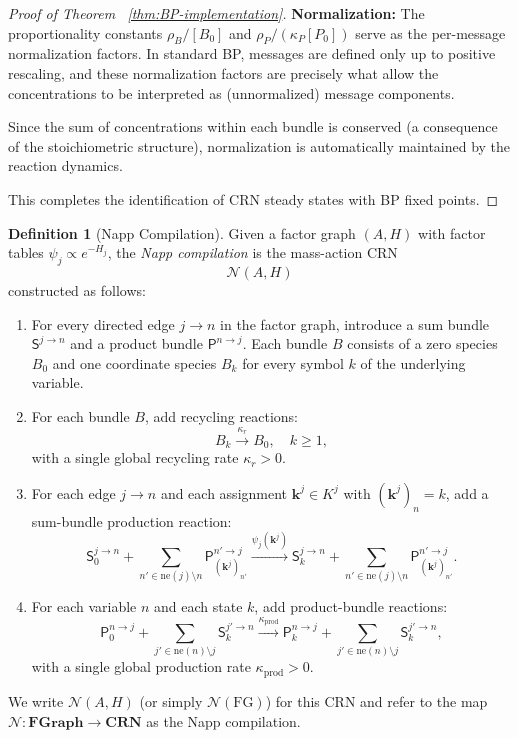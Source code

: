 \documentclass{article}
\theoremstyle{plain}
\theoremstyle{definition}
\newtheorem{definition}[theorem]{Definition}
\theoremstyle{remark}
\newcommand{\<}{\langle}
\renewcommand{\>}{\rangle}
\begin{document}
\begin{proof}[Proof of Theorem ~\ref{thm:BP-implementation}]
\textbf{Normalization:} The proportionality constants $\rho_B/[B_0]$ and 
$\rho_P/(\kappa_P [P_0])$ serve as the per-message normalization factors. 
In standard BP, messages are defined only up to positive rescaling, and these 
normalization factors are precisely what allow the concentrations to be interpreted 
as (unnormalized) message components.

Since the sum of concentrations within each bundle is conserved (a consequence of 
the stoichiometric structure), normalization is automatically maintained by the 
reaction dynamics.

This completes the identification of CRN steady states with BP fixed points.
\end{proof}

\begin{definition}[Napp Compilation]\label{def:napp-compilation}
Given a factor graph $(A, H)$ with factor tables $\psi_j \propto e^{-H_j}$, the 
\emph{Napp compilation} is the mass-action CRN
\[
\mathcal{N}(A, H)
\]
constructed as follows:
\begin{enumerate}
\item For every directed edge $j \to n$ in the factor graph, introduce a sum bundle 
$\mathsf{S}^{j \to n}$ and a product bundle $\mathsf{P}^{n \to j}$. Each bundle $B$ 
consists of a zero species $B_0$ and one coordinate species $B_k$ for every symbol 
$k$ of the underlying variable.

\item For each bundle $B$, add recycling reactions:
\[
B_k \xrightarrow{\kappa_r} B_0, \quad k \geq 1,
\]
with a single global recycling rate $\kappa_r > 0$.

\item For each edge $j \to n$ and each assignment $\mathbf{k}^j \in K^j$ with 
$(\mathbf{k}^j)_n = k$, add a sum-bundle production reaction:
\[
\mathsf{S}^{j \to n}_0 + \sum_{n' \in \mathrm{ne}(j) \setminus n} \mathsf{P}^{n' \to j}_{(\mathbf{k}^j)_{n'}} 
\xrightarrow{\psi_j(\mathbf{k}^j)} 
\mathsf{S}^{j \to n}_k + \sum_{n' \in \mathrm{ne}(j) \setminus n} \mathsf{P}^{n' \to j}_{(\mathbf{k}^j)_{n'}}.
\]

\item For each variable $n$ and each state $k$, add product-bundle reactions:
\[
\mathsf{P}^{n \to j}_0 + \sum_{j' \in \mathrm{ne}(n) \setminus j} \mathsf{S}^{j' \to n}_k 
\xrightarrow{\kappa_{\mathrm{prod}}} 
\mathsf{P}^{n \to j}_k + \sum_{j' \in \mathrm{ne}(n) \setminus j} \mathsf{S}^{j' \to n}_k,
\]
with a single global production rate $\kappa_{\mathrm{prod}} > 0$.
\end{enumerate}

We write $\mathcal{N}(A, H)$ (or simply $\mathcal{N}(\mathrm{FG})$) for this CRN and 
refer to the map $\mathcal{N} : \mathbf{FGraph} \to \mathbf{CRN}$ as the Napp compilation.
\end{definition}
\end{document}
